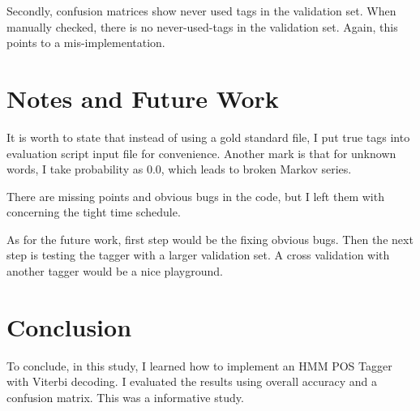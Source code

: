 \documentclass[twocolumn,preprintnumbers,amsmath,amssymb,superscriptaddress,pre]{revtex4}
\theoremstyle{plain}%
\theoremstyle{definition}
\theoremstyle{remark}
\begin{document}
Secondly, confusion matrices show never used tags in the validation set. When manually 
checked, there is no never-used-tags in the validation set. Again, this points to a mis-implementation.

\section{Notes and Future Work}
It is worth to state that instead of using a gold standard file, I put true tags into evaluation script input
file for convenience. Another mark is that for unknown words, I take probability as 0.0, which leads to 
broken Markov series. 

There are missing points and obvious bugs in the code, but I left them with concerning the tight time schedule.

As for the future work, first step would be the fixing obvious bugs. Then the next step is testing the tagger with a larger 
validation set. A cross validation with another tagger would be a nice playground.

 \section{Conclusion}
To conclude, in this study, I learned how to implement an HMM POS Tagger with Viterbi decoding. 
I evaluated the results using overall accuracy and a confusion matrix. This was a informative study.
\end{document}
